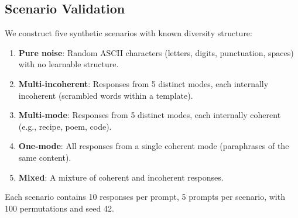 \subsection{Scenario Validation}\label{sec:scenario-validation}

We construct five synthetic scenarios with known diversity structure:
\begin{enumerate}[nosep]
    \item \textbf{Pure noise}: Random ASCII characters (letters, digits, punctuation, spaces) with no learnable structure.
    \item \textbf{Multi-incoherent}: Responses from 5 distinct modes, each internally incoherent (scrambled words within a template).
    \item \textbf{Multi-mode}: Responses from 5 distinct modes, each internally coherent (e.g., recipe, poem, code).
    \item \textbf{One-mode}: All responses from a single coherent mode (paraphrases of the same content).
    \item \textbf{Mixed}: A mixture of coherent and incoherent responses.
\end{enumerate}

Each scenario contains 10 responses per prompt, 5 prompts per scenario, with 100 permutations and seed 42.

\begin{table}[t]
\centering
\caption{Scenario validation metrics (mean across 5 prompts, 100 permutations, $n=10$ responses, per-byte).
We report several candidate scalars: unconditional surprise $a_1$, the curve's last point $a_n$, coherence $C$, our recommended score $D_{Ca_n} = C \times a_n$ (\textbf{bold}), the excess entropy $E$ (Appendix~\ref{app:excess-entropy}), $C \times E$, and the coherence spread $\sigma_\ell$ (the standard deviation of the per-byte cross-entropies $\{h_\theta(r_i \mid p)\}_{i=1}^n$). $D_{Ca_n}$ correctly ranks multi-mode above one-mode and suppresses incoherent scenarios via $C$.
Both $E$ and $C \times E$ go negative for the mixed scenario on GPT-2.
Mixed empirically scores the highest $D_{Ca_n}$ on both models, exceeding multi-mode coherent rather than landing at the ``mid'' position Table~\ref{tab:edge-cases} predicts; this is not the intended ranking.
The coherence spread $\sigma_\ell$ flags this case in its intended diagnostic role (the largest $\sigma_\ell$ across scenarios on both models), reflecting the within-set heterogeneity between coherent and incoherent responses; reweighting variants such as $C^{\alpha} \times a_n$ are discussed in Section~\ref{sec:exp-discussion}.}
\label{tab:scenarios}
\small
\setlength{\tabcolsep}{2pt}

\setlength{\tabcolsep}{6pt}
\end{table}


